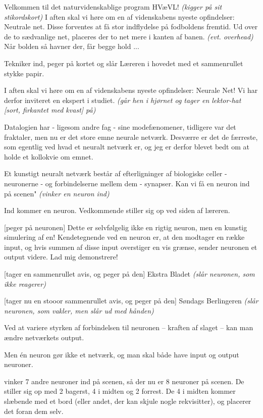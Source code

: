 \documentclass[a4paper,11pt]{article}
\begin{document}
\begin{sketch}



Velkommen til det naturvidenskablige program HVæVL!
   {\em (kigger på sit stik\-ordskort)} I aften skal vi høre om en
af videnskabens nyeste opfindelser: Neutrale net. Disse
forventes at få stor indflydelse på fodboldens fremtid. Ud
over de to sædvanlige net, placeres der to net mere i kanten
af banen. {\em (evt. overhead)} Når bolden så havner der, får begge hold
...

\scene
Tekniker ind, peger på kortet og slår Læreren i hovedet med et
sammenrullet stykke papir.

 I aften skal vi høre om en af videnskabens nyeste
opfindel\-ser: Neurale Net!  Vi har derfor inviteret en ekspert i
studiet. {\em (går hen i hjørnet og tager en lektor-hat [sort,
firkantet med kvast] på)}

 Datalogien har - ligesom andre fag - sine modefænomener,
tidligere var det fraktaler, men nu er det store emne neurale
netværk. Desværre er det de færreste, som egentlig ved hvad et
neuralt netværk er, og jeg er derfor blevet bedt om at holde et
kollokvie om emnet. 

	Et kunstigt neuralt netværk består af efterligninger af
biologiske celler - neuronerne - og forbindelserne mellem dem -
synapser. Kan vi få en neuron ind på scenen" {\em (vinker en neuron
ind)}

\scene
Ind kommer en neuron. Vedkommende stiller sig op ved siden af
læreren.

[peger på neuronen] Dette er selvfølgelig ikke en
rigtig neuron, men en kunstig simulering af en! Kendetegnende ved
en neuron er, at den modtager en række input, og hvis summen af disse
input overstiger en vis grænse, sender neuronen et output videre. Lad
mig demonstrere!

[tager en sammenrullet avis, og peger på den]
 Ekstra Bladet {\em (slår neuronen, som ikke reagerer)}

[tager nu en stooor sammenrullet avis, og peger på den]
Søndags Berlingeren {\em (slår neuronen, som vakler, men slår ud med
hånden)}
	
Ved at variere styrken af forbindelsen til neuronen --
kraften af slaget -- kan man ændre netværkets output.

	Men \'en neuron gør ikke et netværk, og man skal både have
input og output neuroner.

\scene
vinker 7 andre neuroner ind på scenen, så
der nu er 8 neuroner på scenen. De stiller sig op med 2 bagerst, 4 i
midten og 2 forrest. De 4 i midten kommer slæbende med et bord (eller
andet, der kan skjule nogle rekvisitter), og placerer det foran dem
selv.


\end{sketch}
\end{document}
